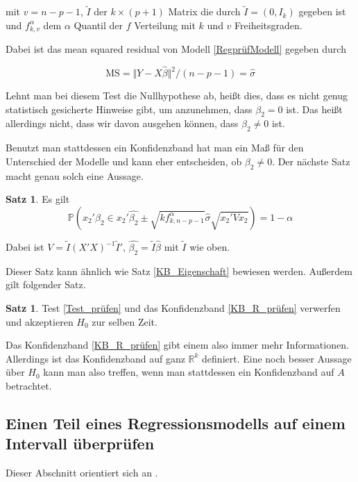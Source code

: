 \documentclass[12pt,a4paper]{article}
\theoremstyle{definition}
\theoremstyle{definition}
\newtheorem{Satz}[Definition]{Satz}
\theoremstyle{definition}
\theoremstyle{definition}
\begin{document}
mit $v=n-p-1$, $\tilde{I}$ der $k \times (p+1)$ Matrix die durch $\tilde{I}=(0,I_k)$ gegeben ist und $f^{\alpha}_{k,v}$ dem $\alpha$ Quantil der $f$ Verteilung mit $k$ und $v$ Freiheitsgraden.

Dabei ist das mean squared residual von Modell \eqref{RegprüfModell} gegeben durch

\begin{equation*}
\text{MS} = \Vert Y - X\hat{\beta} \Vert^2 / (n-p-1) = \hat{\sigma}
\end{equation*}

Lehnt man bei diesem Test die Nullhypothese ab, heißt dies, dass es nicht genug statistisch gesicherte Hinweise gibt, um anzunehmen, dass $\beta_{2} = 0$ ist. Das heißt allerdings nicht, dass wir davon ausgehen können, dass $\beta_2 \neq 0$ ist. 

Benutzt man stattdessen ein Konfidenzband hat man ein Maß für den Unterschied der Modelle und kann eher entscheiden, ob $\beta_2 \neq 0$. Der nächste Satz macht genau solch eine Aussage.

\begin{Satz}
Es gilt
\begin{equation} \label{KB_R_prüfen}
\mathbb{P} \left( x_2'\beta_2 \in x_2'\hat{\beta_2} \pm \sqrt{k f^{\alpha}_{k,n-p-1}} \hat{\sigma} \sqrt{x_2' V x_2} \right) = 1 - \alpha
\end{equation}
\end{Satz}

Dabei ist $V=\tilde{I}(X'X)^{-1}\tilde{I}'$, $\hat{\beta_2} = \tilde{I} \hat{\beta}$ mit $\tilde{I}$ wie oben. 

Dieser Satz kann ähnlich wie Satz \ref{KB_Eigenschaft} bewiesen werden. Außerdem gilt folgender Satz.

\begin{Satz}
Test \eqref{Test_prüfen} und das Konfidenzband \eqref{KB_R_prüfen} verwerfen und akzeptieren $H_0$ zur selben Zeit.
\end{Satz}

Das Konfidenzband \eqref{KB_R_prüfen} gibt einem also immer mehr Informationen. Allerdings ist das Konfidenzband auf ganz $\mathbb{R}^k$ definiert. Eine noch besser Aussage über $H_0$ kann man also treffen, wenn man stattdessen ein Konfidenzband auf $A$ betrachtet. 

\subsection{Einen Teil eines Regressionsmodells auf einem Intervall überprüfen}
\label{Teil eines Regressionsmodells auf einem Intervall überpruefen}
Dieser Abschnitt orientiert sich an \cite[102-105]{Liu64}.
\end{document}
